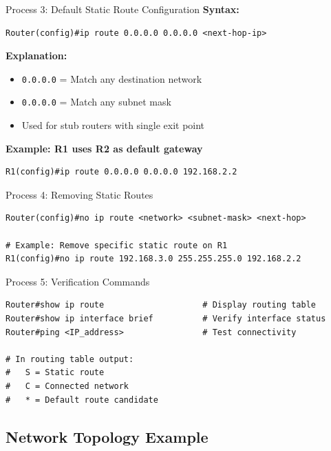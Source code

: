 \documentclass[12pt,a4paper]{article}
\begin{document}
\begin{commandbox}{Process 3: Default Static Route Configuration}
\textbf{Syntax:}
\begin{lstlisting}
Router(config)#ip route 0.0.0.0 0.0.0.0 <next-hop-ip>
\end{lstlisting}

\textbf{Explanation:}
\begin{itemize}[noitemsep]
    \item \texttt{0.0.0.0} = Match any destination network
    \item \texttt{0.0.0.0} = Match any subnet mask
    \item Used for stub routers with single exit point
\end{itemize}

\vspace{0.2cm}
\textbf{Example: R1 uses R2 as default gateway}
\begin{lstlisting}
R1(config)#ip route 0.0.0.0 0.0.0.0 192.168.2.2
\end{lstlisting}
\end{commandbox}

\begin{commandbox}{Process 4: Removing Static Routes}
\begin{lstlisting}
Router(config)#no ip route <network> <subnet-mask> <next-hop>

# Example: Remove specific static route on R1
R1(config)#no ip route 192.168.3.0 255.255.255.0 192.168.2.2
\end{lstlisting}
\end{commandbox}

\begin{commandbox}{Process 5: Verification Commands}
\begin{lstlisting}
Router#show ip route                    # Display routing table
Router#show ip interface brief          # Verify interface status
Router#ping <IP_address>                # Test connectivity

# In routing table output:
#   S = Static route
#   C = Connected network
#   * = Default route candidate
\end{lstlisting}
\end{commandbox}

\subsection{Network Topology Example}
\end{document}
